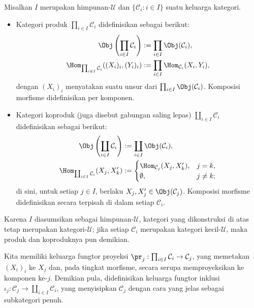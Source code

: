 \begin{definition}
	Misalkan $I$ merupakan himpunan-$\mathcal{U}$ dan $\{\mathcal{C}_i : i \in I \}$ suatu keluarga kategori.
	\begin{itemize}
		\item Kategori produk $\prod_{i \in I} \mathcal{C}_i$ didefinisikan sebagai berikut:
			\begin{align*}
				\Obj\left( \prod_{i \in I} \mathcal{C}_i \right) & := \prod_{i \in I} \Obj(\mathcal{C}_i), \\
				\Hom_{\prod_{i \in I} \mathcal{C}_i}( (X_i)_i, (Y_i)_i ) & := \prod_{i \in I} \Hom_{\mathcal{C}_i}(X_i, Y_i),
			\end{align*}
			dengan $(X_i)_i$ menyatakan suatu unsur dari $\prod_{i \in I} \Obj(\mathcal{C}_i)$. Komposisi morfisme didefinisikan per komponen.
		\item Kategori koproduk (juga disebut gabungan saling lepas) $\coprod_{i \in I} \mathcal{C}_i$ didefinisikan sebagai berikut:
			\begin{align*}
				\Obj\left( \coprod_{i \in I} \mathcal{C}_i \right) & := \coprod_{i \in I} \Obj(\mathcal{C}_i), \\
				\Hom_{\coprod_{i \in I} \mathcal{C}_i}(X_j, X'_k) & :=
				\begin{cases}
					\Hom_{\mathcal{C}_j}(X_j, X'_k), & j = k, \\
					\emptyset, & j \neq k;
				\end{cases}
			\end{align*}
			di sini, untuk setiap $j \in I$, berlaku $X_j, X'_j \in \Obj(\mathcal{C}_j)$. Komposisi morfisme didefinisikan secara terpisah di dalam setiap $\mathcal{C}_i$.
	\end{itemize}
\end{definition}
Karena $I$ diasumsikan sebagai himpunan-$\mathcal{U}$, kategori yang dikonstruksi di atas tetap merupakan kategori-$\mathcal{U}$; jika setiap $\mathcal{C}_i$ merupakan kategori kecil-$\mathcal{U}$, maka produk dan koproduknya pun demikian.

Kita memiliki keluarga fungtor proyeksi $\pr_j: \prod_{i \in I} \mathcal{C}_i \to \mathcal{C}_j$, yang memetakan $(X_i)_i$ ke $X_j$ dan, pada tingkat morfisme, secara serupa memproyeksikan ke komponen ke-$j$. Demikian pula, didefinisikan keluarga fungtor inklusi $\iota_j: \mathcal{C}_j \to \coprod_{i \in I} \mathcal{C}_i$, yang menyisipkan $\mathcal{C}_j$ dengan cara yang jelas sebagai subkategori penuh.

